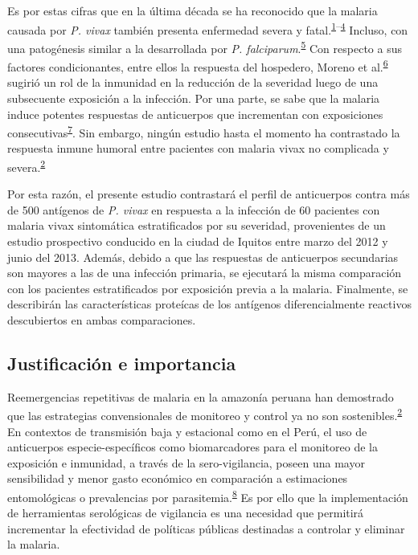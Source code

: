 \documentclass[]{article}
\begin{document}
Es por estas cifras que en la última década se ha reconocido que la
malaria causada por \emph{P. vivax} también presenta enfermedad severa y
fatal.\textsuperscript{\protect\hyperlink{ref-WHO2016world}{1}--\protect\hyperlink{ref-wassmer2015}{4}}
Incluso, con una patogénesis similar a la desarrollada por \emph{P.
falciparum}.\textsuperscript{\protect\hyperlink{ref-barber2015}{5}} Con
respecto a sus factores condicionantes, entre ellos la respuesta del
hospedero, Moreno et
al.\textsuperscript{\protect\hyperlink{ref-Moreno2013}{6}} sugirió un
rol de la inmunidad en la reducción de la severidad luego de una
subsecuente exposición a la infección. Por una parte, se sabe que la
malaria induce potentes respuestas de anticuerpos que incrementan con
exposiciones
consecutivas\textsuperscript{\protect\hyperlink{ref-King2015FOC}{7}}.
Sin embargo, ningún estudio hasta el momento ha contrastado la respuesta
inmune humoral entre pacientes con malaria vivax no complicada y
severa.\textsuperscript{\protect\hyperlink{ref-rosas2016peru}{2}}

Por esta razón, el presente estudio contrastará el perfil de anticuerpos
contra más de 500 antígenos de \emph{P. vivax} en respuesta a la
infección de 60 pacientes con malaria vivax sintomática estratificados
por su severidad, provenientes de un estudio prospectivo conducido en la
ciudad de Iquitos entre marzo del 2012 y junio del 2013. Además, debido
a que las respuestas de anticuerpos secundarias son mayores a las de una
infección primaria, se ejecutará la misma comparación con los pacientes
estratificados por exposición previa a la malaria. Finalmente, se
describirán las características proteícas de los antígenos
diferencialmente reactivos descubiertos en ambas comparaciones.

\subsection{Justificación e importancia}\label{justif}

Reemergencias repetitivas de malaria en la amazonía peruana han
demostrado que las estrategias convensionales de monitoreo y control ya
no son
sostenibles.\textsuperscript{\protect\hyperlink{ref-rosas2016peru}{2}}
En contextos de transmisión baja y estacional como en el Perú, el uso de
anticuerpos especie-específicos como biomarcadores para el monitoreo de
la exposición e inmunidad, a través de la sero-vigilancia, poseen una
mayor sensibilidad y menor gasto económico en comparación a estimaciones
entomológicas o prevalencias por
parasitemia.\textsuperscript{\protect\hyperlink{ref-elliott2014}{8}} Es
por ello que la implementación de herramientas serológicas de vigilancia
es una necesidad que permitirá incrementar la efectividad de políticas
públicas destinadas a controlar y eliminar la malaria.
\end{document}
